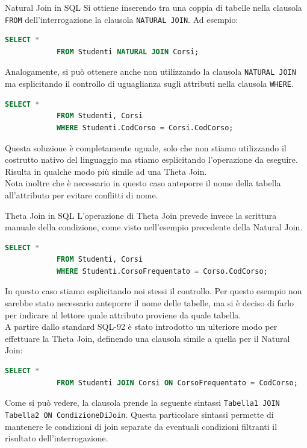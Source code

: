 \documentclass[12pt]{report}
\begin{document}
	\begin{definizione}{Natural Join in SQL}{}
		Si ottiene inserendo tra una coppia di tabelle nella clausola \texttt{FROM} dell'interrogazione la clausola \texttt{NATURAL JOIN}. Ad esempio:
		\begin{lstlisting}[language=SQL]
			SELECT *
			FROM Studenti NATURAL JOIN Corsi;
		\end{lstlisting}
		
		Analogamente, si può ottenere anche non utilizzando la clausola \texttt{NATURAL JOIN} ma esplicitando il controllo di uguaglianza sugli attributi nella clausola \texttt{WHERE}.
		\begin{lstlisting}[language=SQL]
			SELECT *
			FROM Studenti, Corsi
			WHERE Studenti.CodCorso = Corsi.CodCorso;
		\end{lstlisting}
		Questa soluzione è completamente uguale, solo che non stiamo utilizzando il costrutto nativo del linguaggio ma stiamo esplicitando l'operazione da eseguire. Risulta in qualche modo più simile ad una Theta Join.\\ 
		Nota inoltre che è necessario in questo caso anteporre il nome della tabella all'attributo per evitare conflitti di nome.
	\end{definizione}
	
	\begin{definizione}{Theta Join in SQL}{}
		L'operazione di Theta Join prevede invece la scrittura manuale della condizione, come visto nell'esempio precedente della Natural Join.
		\begin{lstlisting}[language=SQL]
			SELECT *
			FROM Studenti, Corsi
			WHERE Studenti.CorsoFrequentato = Corso.CodCorso;
		\end{lstlisting}
		In questo caso stiamo esplicitando noi stessi il controllo. Per questo esempio non sarebbe stato necessario anteporre il nome delle tabelle, ma si è deciso di farlo per indicare al lettore quale attributo proviene da quale tabella.\\
		A partire dallo standard SQL-92 è stato introdotto un ulteriore modo per effettuare la Theta Join, definendo una clausola simile a quella per il Natural Join:
		\begin{lstlisting}[language=SQL]
			SELECT *
			FROM Studenti JOIN Corsi ON CorsoFrequentato = CodCorso;
		\end{lstlisting}
		Come si può vedere, la clausola prende la seguente sintassi \texttt{Tabella1 JOIN Tabella2 ON CondizioneDiJoin}.
		Questa particolare sintassi permette di mantenere le condizioni di join separate da eventuali condizioni filtranti il risultato dell'interrogazione.
	\end{definizione}
	
\end{document}
